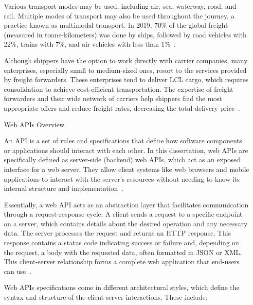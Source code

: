 \documentclass[12pt, reqno, oneside]{amsbook}
\makeatletter
\def\section{\@startsection{section}{1}%
      \z@{.5\linespacing\@plus.7\linespacing}{.25\linespacing}%
      {\normalfont\bfseries\flushleft}}
\theoremstyle{definition}
\theoremstyle{definition}
\numberwithin{section}{chapter}
\numberwithin{table}{chapter}
\numberwithin{figure}{chapter}
\makeatother
\begin{document}
Various transport modes may be used, including air, sea, waterway, road, and rail. Multiple modes of transport may also be used throughout the journey, a practice known as multimodal transport. In 2019, 70\% of the global freight (measured in tonne-kilometers) was done by ships, followed by road vehicles with 22\%, trains with 7\%, and air vehicles with less than 1\%~\cite{ITF2023}.

Although shippers have the option to work directly with carrier companies, many enterprises, especially small to medium-sized ones, resort to the services provided by freight forwarders. These enterprises tend to deliver \ac{LCL} cargo, which requires consolidation to achieve cost-efficient transportation. The expertise of freight forwarders and their wide network of carriers help shippers find the most appropriate offers and reduce freight rates, decreasing the total delivery price~\cite{Huang2019}.


\section{Web \texorpdfstring{\acp{API}}{API} Overview}
\label{Section:Web_API_Overview}

An \ac{API} is a set of rules and specifications that define how software components or applications should interact with each other. In this dissertation, web \acp{API} are specifically defined as server-side (backend) web \acp{API}, which act as an exposed interface for a web server. They allow client systems like web browsers and mobile applications to interact with the server's resources without needing to know its internal structure and implementation~\cite{Jin2018,Neumann2021, Khozaimi2022}.

Essentially, a web \ac{API} acts as an abstraction layer that facilitates communication through a request-response cycle. A client sends a request to a specific endpoint on a server, which contains details about the desired operation and any necessary data. The server processes the request and returns an \ac{HTTP} response. This response contains a status code indicating success or failure and, depending on the request, a body with the requested data, often formatted in \ac{JSON} or \ac{XML}. This client-server relationship forms a complete web application that end-users can use~\cite{Jin2018,Neumann2021, Khozaimi2022}.

Web \acp{API} specifications come in different architectural styles, which define the syntax and structure of the client-server interactions. These include:
\end{document}
